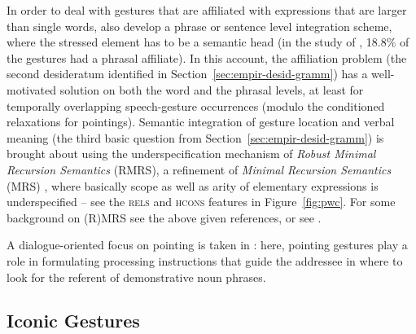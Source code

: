 \documentclass[output=paper]{langsci/langscibook}
\begin{document}
In order to deal with gestures that are affiliated with expressions that are larger than single words, \citet{Alahverdzhieva:Lascarides:Flickinger:2017} also develop a phrase or sentence level integration scheme, where the stressed element has to be a semantic head (in the study of \citealt{Mehler:Luecking:2012:d}, 18.8\% of the gestures had a phrasal affiliate).
%
In this account, the affiliation problem (the second desideratum identified in Section~\ref{sec:empir-desid-gramm}) has a well-motivated solution on both the word and the phrasal levels, at least for temporally overlapping speech-gesture occurrences (modulo the conditioned relaxations for pointings).
%
Semantic integration of gesture location and verbal meaning (the third basic question from Section~\ref{sec:empir-desid-gramm}) is brought about using the underspecification mechanism of \emph{Robust Minimal Recursion Semantics}  (RMRS), a refinement of \emph{Minimal Recursion Semantics}  (MRS) \citep{Copestake:Flickinger:Pollard:Sag:2005}, where basically scope as well as arity of elementary expressions is underspecified \citep{Copestake:2007} -- see the \textsc{rels} and \textsc{hcons} features in Figure~\ref{fig:pwc}.
%
For some background on (R)MRS see the above given references, or see . %


A dialogue-oriented focus on pointing is taken in \citet{Luecking:2018:a}: here, pointing gestures play a role in formulating processing instructions that guide the addressee in where to look for the referent of demonstrative noun phrases. %
 



\subsection{Iconic Gestures}
\label{sec:iconic-gestures}
\end{document}
